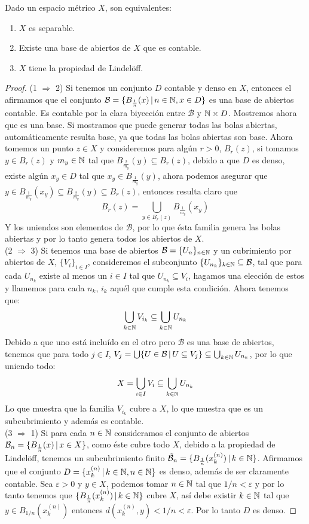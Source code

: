\documentclass[12pt,a4paper]{book}
\begin{document}
\begin{teo}
Dado un espacio métrico $X$, son equivalentes:
\begin{enumerate}
\item $X$ es separable.
\item Existe una base de abiertos de $X$ que es contable.
\item $X$ tiene la propiedad de Lindelöff.
\end{enumerate}
\begin{proof}
(1 $\Rightarrow$ 2) Si tenemos un conjunto $D$ contable y denso en $X$, entonces el afirmamos que el conjunto $ \mathcal{B} = \{ B_{\frac{1}{n}}(x) \,\vert\, n \in \mathbb{N}, x \in D\}$ es una base de abiertos contable. Es contable por la clara biyección entre $\mathcal{B}$ y $\mathbb{N} \times D$. Mostremos ahora que es una base. Si mostramos que puede generar todas las bolas abiertas, automáticamente resulta base, ya que todas las bolas abiertas son base. Ahora tomemos un punto $z \in X$ y consideremos para algún $r >0$, $B_r(z)$, si tomamos $y \in B_r(z)$ y $m_y \in \mathbb{N}$ tal que $B_{\frac{2}{m_y}}(y) \subseteq B_r(z)$, debido a que $D$ es denso, existe algún $x_y \in D$ tal que $x_y \in B_{\frac{1}{m_y}}(y)$, ahora podemos asegurar que $ y \in B_{\frac{1}{m_y}}(x_y) \subseteq B_{\frac{2}{m_y}}(y) \subseteq B_r(z)$, entonces  resulta claro que 
$$ B_r(z) = \bigcup_{y \in B_r(z)} B_{\frac{1}{m_y}}(x_y)$$
Y los uniendos son elementos de $\mathcal{B}$, por lo que ésta familia genera las bolas abiertas y por lo tanto genera todos los abiertos de $X$.\\
(2 $\Rightarrow$ 3) Si tenemos una base de abiertos $\mathcal{B}=\{U_n\}_{{n} \in \mathbb{N}}$ y un cubrimiento por abiertos de $X$, $\{V_i\}_{i \in I}$, consideremos el subconjunto $\{U_{n_k}\}_{{k} \in \mathbb{N}} \subseteq \mathcal{B}$, tal que para cada $U_{n_k}$ existe al menos un $i \in I$ tal que $U_{n_k} \subseteq V_i$, hagamos una elección de estos y llamemos para cada $n_k$, $i_k$ aquél que cumple esta condición. Ahora tenemos que:
$$ \bigcup_{k \in \mathbb{N}} V_{i_k} \subseteq \bigcup_{{k} \in \mathbb{N}} U_{n_k}$$
Debido a que uno está incluído en el otro pero $\mathcal{B}$ es una base de abiertos, tenemos que para todo $j \in I$, $V_j = \bigcup\{U \in \mathcal{B} \,\vert\, U \subseteq V_j\} \subseteq \bigcup_{{k} \in \mathbb{N}} U_{n_k}$, por lo que uniendo todo:
$$ X = \bigcup_{i \in I} V_i \subseteq \bigcup_{{k} \in \mathbb{N}} U_{n_k}$$
Lo que muestra que la familia $V_{i_k}$ cubre a $X$, lo que muestra que es un subcubrimiento y además es contable.\\
(3 $\Rightarrow$ 1) Si para cada $n \in \mathbb{N}$ consideramos el conjunto de abiertos $\mathcal{B}_n = \{ B_{\frac{1}{n}}(x) \,\vert\, x \in X\}$, como éste cubre todo $X$, debido a la propiedad de Lindelöff, tenemos un subcubrimiento finito $\tilde{\mathcal{B}}_n = \{ B_{\frac{1}{n}}(x^{(n)}_k) \,\vert\, {{k} \in \mathbb{N}}\}$. Afirmamos que el conjunto $D=\{x^{(n)}_k \,\vert\, {{k} \in \mathbb{N}},{{n} \in \mathbb{N}}\}$ es denso, además de ser claramente contable. Sea $\varepsilon >0$ y $y \in X$, podemos tomar $n \in \mathbb{N}$ tal que $1/n < \varepsilon$ y por lo tanto tenemos que $\{ B_{\frac{1}{n}}(x^{(n)}_k) \,\vert\, {{k} \in \mathbb{N}}\}$ cubre $X$, así debe existir $k \in \mathbb{N}$ tal que $y \in B_{1/n}(x^{(n)}_k)$ entonces $d(x^{(n)}_k,y)<1/n < \varepsilon$. Por lo tanto $D$ es denso.
\end{proof}
\end{teo}
\ifx\isEmbedded\undefined
\end{document}
